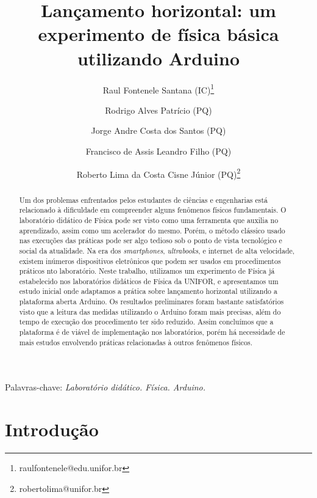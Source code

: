 \documentclass[article,11pt,a4paper]{abntex2}
\title{Lançamento horizontal: um experimento de física básica utilizando Arduino}
\author[1]{Raul Fontenele Santana (IC)\thanks{raulfontenele@edu.unifor.br}}
\author[1]{Rodrigo Alves Patrício (PQ)}
\author[1]{Jorge Andre Costa dos Santos (PQ)}
\author[2]{Francisco de Assis Leandro Filho (PQ)}
\author[1]{Roberto Lima da Costa Cisne Júnior (PQ)\thanks{robertolima@unifor.br}}
\affil[1]{Universidade de Fortaleza {-} UNIFOR}
\affil[2]{Instituto Federal de Educação, Ciência e Tecnologia do Ceará {-} IFCE}
\newcommand{\keywords}[1]{\noindent Palavras-chave: \textit{#1}}
\begin{document}
\maketitle



\keywords{Laboratório didático. Física. Arduino.}



\begin{abstract}

\noindent
Um dos problemas enfrentados pelos estudantes de ciências e engenharias está relacionado à dificuldade em compreender alguns fenômenos físicos fundamentais.
O laboratório didático de Física pode ser visto como uma ferramenta que auxilia no aprendizado, assim como um acelerador do mesmo.
Porém, o método clássico usado nas execuções das práticas pode ser algo tedioso sob o ponto de vista tecnológico e social da atualidade.
Na era dos \emph{smartphones}, \emph{ultrabooks}, e internet de alta velocidade, existem inúmeros dispositivos eletrônicos que podem ser usados em procedimentos práticos nto laboratório.
Neste trabalho, utilizamos um experimento de Física já estabelecido nos laboratórios didáticos de Física da UNIFOR, e apresentamos um estudo inicial onde adaptamos a prática sobre lançamento horizontal utilizando a plataforma aberta Arduino.
Os resultados preliminares foram bastante satisfatórios visto que a leitura das medidas utilizando o Arduino foram mais precisas, além do tempo de execução dos procedimento ter sido reduzido. Assim concluímos que a plataforma é de viável de implementação nos laboratórios, porém há necessidade de mais estudos envolvendo práticas relacionadas à outros fenômenos físicos.

\end{abstract}



\section{Introdução}
\end{document}
